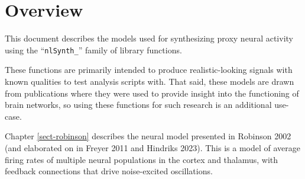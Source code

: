 
\chapter{Overview}
\label{sect-over}


This document describes the models used for synthesizing proxy neural
activity using the ``\texttt{nlSynth\_}'' family of library functions.

These functions are primarily intended to produce realistic-looking signals
with known qualities to test analysis scripts with. That said, these models
are drawn from publications where they were used to provide insight into
the functioning of brain networks, so using these functions for such
research is an additional use-case.

Chapter \ref{sect-robinson} describes the neural model presented in
Robinson 2002 (and elaborated on in Freyer 2011 and Hindriks 2023). This
is a model of average firing rates of multiple neural populations in the
cortex and thalamus, with feedback connections that drive noise-excited
oscillations.


%
